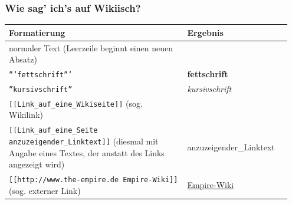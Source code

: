 \documentclass{beamer}
\begin{document}
\begin{frame}
  \frametitle{Wie sag’ ich’s auf Wikiisch?}
  
  \begin{tabular}{|p{0.60\linewidth}|p{0.35\linewidth}|}
    \toprule
    \textbf{Formatierung } & \textbf{Ergebnis } \\ 
    \midrule
     
    normaler Text\newline
    (Leerzeile beginnt einen neuen Absatz) & \\ 

    \midrule
 
    \texttt{'''fettschrift'''} & \textbf{fettschrift} \\ 

    \midrule
     
    \texttt{''kursivschrift''} & \emph{kursivschrift} \\ 

    \midrule
     
    \texttt{[[Link\_auf\_eine\_Wikiseite]]}\newline
    (sog. Wikilink) & \\ 

    \midrule
    
    \texttt{[[Link\_auf\_eine\_Seite anzuzeigender\_Linktext]]}\newline
    (diesmal mit Angabe eines Textes, der anstatt des Links angezeigt wird)
                           &  anzuzeigender\_Linktext \\ 

    \midrule
     
    \texttt{[[http://www.the-empire.de Empire-Wiki]]}\newline
    (sog. externer Link) & \href{http://www.the-empire.de}{Empire-Wiki} \\ 

    \bottomrule
  \end{tabular}
  

\end{frame}
\end{document}
